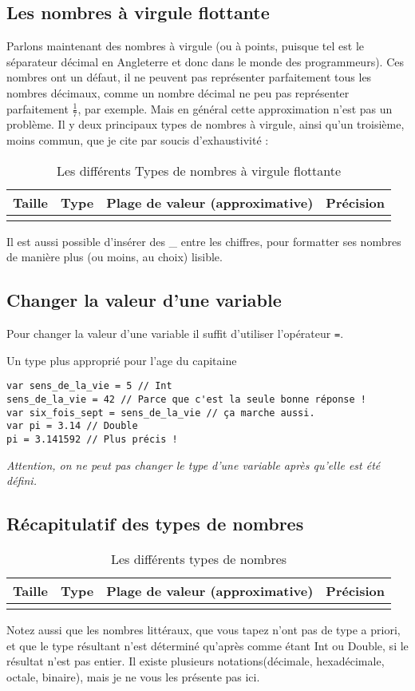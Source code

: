\subsection{Les nombres à virgule flottante}
Parlons maintenant des nombres à virgule (ou à points, puisque tel est le séparateur décimal en Angleterre et donc dans le monde des programmeurs).
Ces nombres ont un défaut, il ne peuvent pas représenter parfaitement tous les nombres décimaux, comme un nombre décimal ne peu pas représenter parfaitement \begin{math} \frac{1}{7} \end{math}, par exemple. Mais en général cette approximation n'est pas un problème.
Il y deux principaux types de nombres à virgule, ainsi qu'un troisième, moins commun, que je cite par soucis d'exhaustivité :
\begin{longtabu} to \linewidth {|X[3,l,m]|X[1,l,m]|X[4,r,m]|X[3,r,m]|}
\hline Taille & Type & Plage de valeur (approximative) & Précision \\ \hline
\endhead

\caption{Les différents Types de nombres à virgule flottante}
\end{longtabu}

Il est aussi possible d'insérer des \_ entre les chiffres, pour formatter ses nombres de manière plus (ou moins, au choix) lisible.

\subsection{Changer la valeur d'une variable}
Pour changer la valeur d'une variable il suffit d'utiliser l'opérateur \verb"=".
\begin{listing}[h]
\caption{Un type plus approprié pour l'age du capitaine}
\begin{verbatim}
var sens_de_la_vie = 5 // Int
sens_de_la_vie = 42 // Parce que c'est la seule bonne réponse !
var six_fois_sept = sens_de_la_vie // ça marche aussi.
var pi = 3.14 // Double
pi = 3.141592 // Plus précis !
\end{verbatim}
\end{listing}

\emph{Attention, on ne peut pas changer le type d'une variable après qu'elle est été défini.}
\subsection{Récapitulatif des types de nombres}
\begin{longtabu} to \linewidth {|X[2,l,m]|X[1,l,m]|X[4,r,m]|X[2,r,m]|}
\hline Taille & Type & Plage de valeur (approximative) & Précision \\ \hline
\endhead


\caption{Les différents types de nombres}
\end{longtabu}
Notez aussi que les nombres littéraux, que vous tapez n'ont pas de type a priori, et que le type résultant n'est déterminé qu'après comme étant Int ou Double, si le résultat n'est pas entier. Il existe plusieurs notations(décimale, hexadécimale, octale, binaire), mais je ne vous les présente pas ici.
